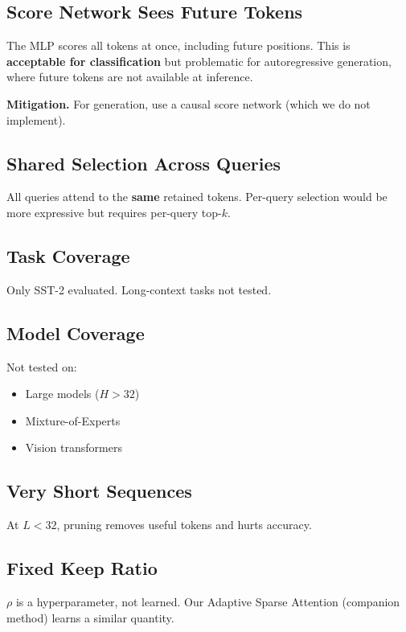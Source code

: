 \subsection{Score Network Sees Future Tokens}

The MLP scores all tokens at once, including future positions. This is 
\textbf{acceptable for classification} but problematic for autoregressive 
generation, where future tokens are not available at inference.

\textbf{Mitigation.} For generation, use a causal score network (which we do 
not implement).

\subsection{Shared Selection Across Queries}

All queries attend to the \textbf{same} retained tokens. Per-query selection 
would be more expressive but requires per-query top-$k$.

\subsection{Task Coverage}

Only SST-2 evaluated. Long-context tasks not tested.

\subsection{Model Coverage}

Not tested on:
\begin{itemize}
\item Large models ($H > 32$)
\item Mixture-of-Experts
\item Vision transformers

\end{itemize}
\subsection{Very Short Sequences}

At $L < 32$, pruning removes useful tokens and hurts accuracy.

\subsection{Fixed Keep Ratio}

$\rho$ is a hyperparameter, not learned. Our Adaptive Sparse Attention 
(companion method) learns a similar quantity.

